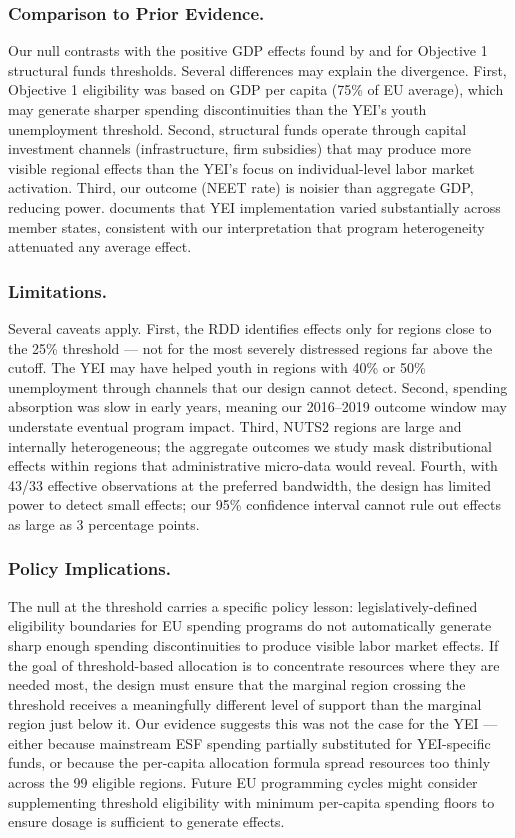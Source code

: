 \documentclass[12pt]{article}
\begin{document}
\subsubsection*{Comparison to Prior Evidence.} Our null contrasts with the positive GDP effects found by \citet{becker2010going} and \citet{pellegrini2013measuring} for Objective 1 structural funds thresholds. Several differences may explain the divergence. First, Objective 1 eligibility was based on GDP per capita (75\% of EU average), which may generate sharper spending discontinuities than the YEI's youth unemployment threshold. Second, structural funds operate through capital investment channels (infrastructure, firm subsidies) that may produce more visible regional effects than the YEI's focus on individual-level labor market activation. Third, our outcome (NEET rate) is noisier than aggregate GDP, reducing power. \citet{ferrante2025youth} documents that YEI implementation varied substantially across member states, consistent with our interpretation that program heterogeneity attenuated any average effect.

\subsubsection*{Limitations.} Several caveats apply. First, the RDD identifies effects only for regions close to the 25\% threshold --- not for the most severely distressed regions far above the cutoff. The YEI may have helped youth in regions with 40\% or 50\% unemployment through channels that our design cannot detect. Second, spending absorption was slow in early years, meaning our 2016--2019 outcome window may understate eventual program impact. Third, NUTS2 regions are large and internally heterogeneous; the aggregate outcomes we study mask distributional effects within regions that administrative micro-data would reveal. Fourth, with 43/33 effective observations at the preferred bandwidth, the design has limited power to detect small effects; our 95\% confidence interval cannot rule out effects as large as 3 percentage points.

\subsubsection*{Policy Implications.} The null at the threshold carries a specific policy lesson: legislatively-defined eligibility boundaries for EU spending programs do not automatically generate sharp enough spending discontinuities to produce visible labor market effects. If the goal of threshold-based allocation is to concentrate resources where they are needed most, the design must ensure that the marginal region crossing the threshold receives a meaningfully different level of support than the marginal region just below it. Our evidence suggests this was not the case for the YEI --- either because mainstream ESF spending partially substituted for YEI-specific funds, or because the per-capita allocation formula spread resources too thinly across the 99 eligible regions. Future EU programming cycles might consider supplementing threshold eligibility with minimum per-capita spending floors to ensure dosage is sufficient to generate effects.
\end{document}
